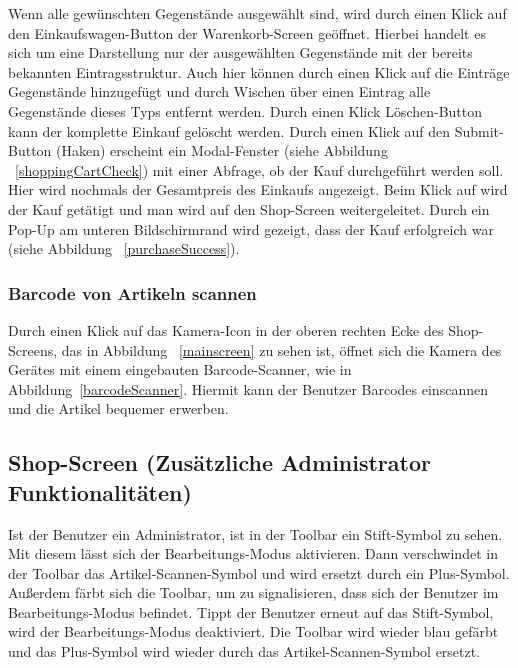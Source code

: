 Wenn alle gewünschten Gegenstände ausgewählt sind, wird durch einen Klick auf den Einkaufswagen-Button der Warenkorb-Screen geöffnet.
Hierbei handelt es sich um eine Darstellung nur der ausgewählten Gegenstände mit der bereits bekannten Eintragsstruktur.
Auch hier können durch einen Klick auf die Einträge Gegenstände hinzugefügt und durch Wischen über einen Eintrag alle Gegenstände dieses Typs entfernt werden.
Durch einen Klick Löschen-Button kann der komplette Einkauf gelöscht werden.
Durch einen Klick auf den Submit-Button (Haken) erscheint ein Modal-Fenster (siehe Abbildung ~\ref{shoppingCartCheck}) mit einer Abfrage, ob der Kauf durchgeführt werden soll.
Hier wird nochmals der Gesamtpreis des Einkaufs angezeigt.
Beim Klick auf  wird der Kauf getätigt und man wird auf den Shop-Screen weitergeleitet.
Durch ein Pop-Up am unteren Bildschirmrand wird gezeigt, dass der Kauf erfolgreich war (siehe Abbildung ~\ref{purchaseSuccess}).


\subsubsection{Barcode von Artikeln scannen} \label{subsubsec:shop-scan-item}

Durch einen Klick auf das Kamera-Icon in der oberen rechten Ecke des Shop-Screens, das in Abbildung ~\ref{mainscreen} zu sehen ist, öffnet sich die Kamera des Gerätes mit einem eingebauten Barcode-Scanner, wie in Abbildung~\ref{barcodeScanner}.
Hiermit kann der Benutzer Barcodes einscannen und die Artikel bequemer erwerben.


\subsection{Shop-Screen (Zusätzliche Administrator Funktionalitäten)} \label{subsec:shop-screen-admin}

Ist der Benutzer ein Administrator, ist in der Toolbar ein Stift-Symbol zu sehen.
Mit diesem lässt sich der Bearbeitungs-Modus aktivieren.
Dann verschwindet in der Toolbar das Artikel-Scannen-Symbol und wird ersetzt durch ein Plus-Symbol.
Außerdem färbt sich die Toolbar, um zu signalisieren, dass sich der Benutzer im Bearbeitungs-Modus befindet.
Tippt der Benutzer erneut auf das Stift-Symbol, wird der Bearbeitungs-Modus deaktiviert.
Die Toolbar wird wieder blau gefärbt und das Plus-Symbol wird wieder durch das Artikel-Scannen-Symbol ersetzt.

